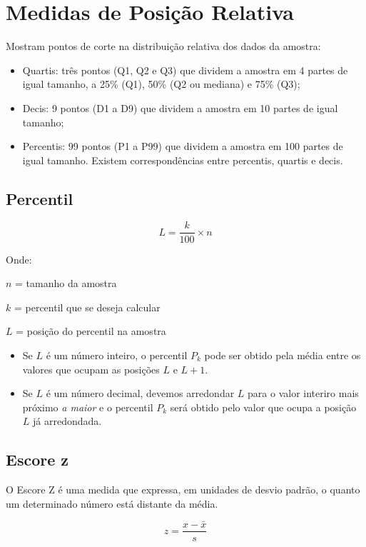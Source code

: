 \section{Medidas de Posição Relativa}

Mostram pontos de corte na distribuição relativa dos dados da amostra:

\begin{itemize}
	\item Quartis: três pontos (Q1, Q2 e Q3) que dividem a amostra em 4 partes de igual tamanho, a 25\% (Q1), 50\% (Q2 ou mediana) e 75\% (Q3);
	\item Decis: 9 pontos (D1 a D9) que dividem a amostra em 10 partes  de igual tamanho;
	\item Percentis: 99 pontos (P1 a P99) que dividem a amostra em 100 partes  de igual tamanho. Existem correspondências entre percentis, quartis e decis.
\end{itemize}

\subsection{Percentil}

\[L = \frac{k}{100} \times n\]

Onde:

\(n\) = tamanho da amostra

\(k\) = percentil que se deseja calcular	

\(L\) = posição do percentil na amostra

\begin{itemize}
    \item Se \(L\) é um número inteiro, o percentil \(P_k\) pode ser obtido pela média 			entre os valores que ocupam as posições \(L\) e \(L+1\).
    \item Se \(L\) é um número decimal, devemos arredondar \(L\) para o valor interiro 			mais próximo \emph{a maior} e o percentil \(P_k\) será obtido pelo valor que ocupa a 		posição \(L\) já arredondada.      
\end{itemize}

\subsection{Escore z}

O Escore Z é uma medida que expressa, em unidades de desvio padrão, o quanto um determinado número está distante da média.

\[z = \frac{x-\bar{x}}{s}\]

